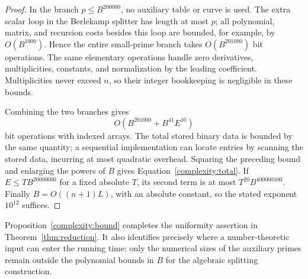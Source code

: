 \begin{proof}
In the branch $p\le B^{200000}$, no auxiliary table or curve is used.
The extra scalar loop in the Berlekamp splitter has length at most $p$;
all polynomial, matrix, and recursion costs besides this loop are
bounded, for example, by $O(B^{1000})$.  Hence the entire small-prime
branch takes $O(B^{201000})$ bit operations.  The same elementary
operations handle zero derivatives, multiplicities, constants, and
normalization by the leading coefficient.  Multiplicities never
exceed $n$, so their integer bookkeeping is negligible in these bounds.

Combining the two branches gives
\[
 O\left(B^{201000}+B^{41}E^{10}\right)
\]
bit operations with indexed arrays.  The total stored binary data is
bounded by the same quantity; a sequential implementation can locate
entries by scanning the stored data, incurring at most quadratic overhead.
Squaring the preceding bound and enlarging the powers of $B$ gives
Equation~\eqref{complexity:total}.  If $E\le T B^{20000000}$ for a fixed
absolute $T$, its second term is at most $T^{20}B^{400000100}$.
Finally $B=O((n+1)L)$, with an absolute constant, so the stated exponent
$10^{12}$ suffices.
\end{proof}

Proposition~\ref{complexity:bound} completes the uniformity assertion in
Theorem~\ref{thm:reduction}.  It also identifies precisely where a
number-theoretic input can enter the running time: only the numerical
sizes of the auxiliary primes remain outside the polynomial bounds in
$B$ for the algebraic splitting construction.
